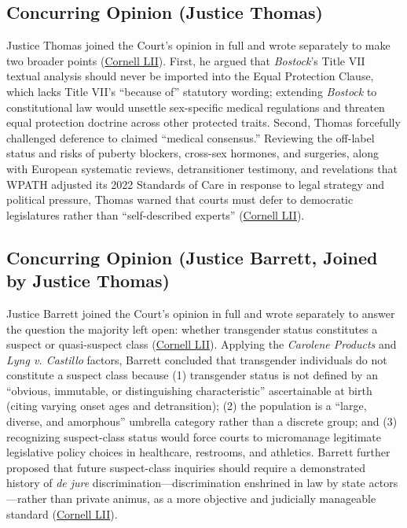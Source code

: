 \documentclass[12pt]{article}
\begin{document}
\subsection{Concurring Opinion (Justice Thomas)}

Justice Thomas joined the Court's opinion in full and wrote separately to make two broader points (\href{https://www.law.cornell.edu/supremecourt/text/23-477}{Cornell LII}). First, he argued that \textit{Bostock}'s Title VII textual analysis should never be imported into the Equal Protection Clause, which lacks Title VII's ``because of'' statutory wording; extending \textit{Bostock} to constitutional law would unsettle sex-specific medical regulations and threaten equal protection doctrine across other protected traits. Second, Thomas forcefully challenged deference to claimed ``medical consensus.'' Reviewing the off-label status and risks of puberty blockers, cross-sex hormones, and surgeries, along with European systematic reviews, detransitioner testimony, and revelations that WPATH adjusted its 2022 Standards of Care in response to legal strategy and political pressure, Thomas warned that courts must defer to democratic legislatures rather than ``self-described experts'' (\href{https://www.law.cornell.edu/supremecourt/text/23-477}{Cornell LII}).

\subsection{Concurring Opinion (Justice Barrett, Joined by Justice Thomas)}

Justice Barrett joined the Court's opinion in full and wrote separately to answer the question the majority left open: whether transgender status constitutes a suspect or quasi-suspect class (\href{https://www.law.cornell.edu/supremecourt/text/23-477}{Cornell LII}). Applying the \textit{Carolene Products} and \textit{Lyng v. Castillo} factors, Barrett concluded that transgender individuals do not constitute a suspect class because (1) transgender status is not defined by an ``obvious, immutable, or distinguishing characteristic'' ascertainable at birth (citing varying onset ages and detransition); (2) the population is a ``large, diverse, and amorphous'' umbrella category rather than a discrete group; and (3) recognizing suspect-class status would force courts to micromanage legitimate legislative policy choices in healthcare, restrooms, and athletics. Barrett further proposed that future suspect-class inquiries should require a demonstrated history of \textit{de jure} discrimination---discrimination enshrined in law by state actors---rather than private animus, as a more objective and judicially manageable standard (\href{https://www.law.cornell.edu/supremecourt/text/23-477}{Cornell LII}).
\end{document}
